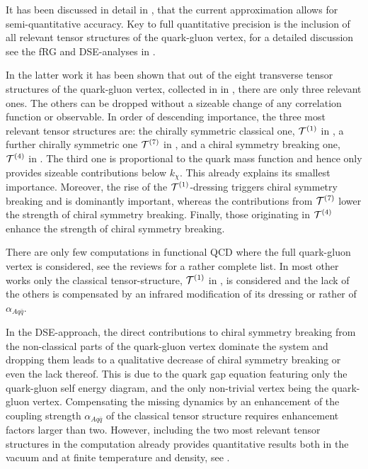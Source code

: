 \documentclass[aps,twocolumn,prd,superscriptaddress]{revtex4-2}
\begin{document}
It has been discussed in detail in \cite{Fu:2019hdw}, that the current approximation allows for semi-quantitative accuracy. Key to full quantitative precision is the inclusion of all relevant tensor structures of the quark-gluon vertex, for a detailed discussion see the fRG and DSE-analyses in \cite{Mitter:2014wpa, Cyrol:2017ewj, Gao:2021wun}. 

In the latter work it has been shown that out of the eight transverse tensor structures of the quark-gluon vertex, collected in  in , 
there are only three relevant ones. The others can be dropped without a sizeable change of any correlation function or observable. In order of descending importance, the three most relevant tensor structures are: the chirally symmetric classical one, ${\cal T}^{(1)}$ in , a further chirally symmetric one ${\cal T}^{(7)}$ in , and a chiral symmetry breaking one, ${\cal T}^{(4)}$ in . The third one is proportional to the quark mass function and hence only provides sizeable contributions below $k_\chi$. This already explains its smallest importance. Moreover, the rise of the ${\cal T}^{(1)}$-dressing triggers chiral symmetry breaking and is dominantly important, whereas the contributions from ${\cal T}^{(7)}$ lower the strength of chiral symmetry breaking. Finally, those originating in ${\cal T}^{(4)}$ enhance the strength of chiral symmetry breaking. 

There are only few computations in functional QCD where the full quark-gluon vertex is considered, see the reviews \cite{Eichmann:2016yit, Fischer:2018sdj, Dupuis:2020fhh, Fu:2022gou} for a rather complete list. In most other works only the classical tensor-structure, ${\cal T}^{(1)}$ in , is considered and the lack of the others is compensated by an infrared modification of its dressing or rather of $\alpha_{Aq \bar q}$. 

In the DSE-approach, the direct contributions to chiral symmetry breaking from the non-classical parts of the quark-gluon vertex dominate the system and dropping them leads to a qualitative decrease of chiral symmetry breaking or even the lack thereof. This is due to the quark gap equation featuring only the quark-gluon self energy diagram, and the only non-trivial vertex being the quark-gluon vertex.
Compensating the missing dynamics by an enhancement of the coupling strength $\alpha_{Aq \bar q}$ of the classical tensor structure requires enhancement factors larger than two. However, including the two most relevant tensor structures in the computation already provides quantitative results both in the vacuum and at finite temperature and density, see \cite{Gao:2020qsj,Gao:2021wun}.
\end{document}
